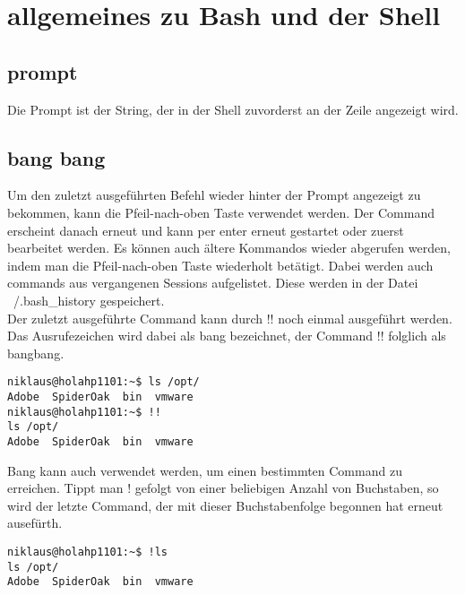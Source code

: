\section{allgemeines zu Bash und der Shell}
\subsection{prompt}
Die Prompt ist der String, der in der Shell zuvorderst an der Zeile angezeigt wird.
\subsection{bang bang}
Um den zuletzt ausgef\"uhrten Befehl wieder hinter der Prompt angezeigt zu bekommen, kann die Pfeil-nach-oben Taste verwendet werden. Der Command erscheint danach erneut und kann per enter erneut gestartet oder zuerst bearbeitet werden. Es k\"onnen auch \"altere Kommandos wieder abgerufen werden, indem man die Pfeil-nach-oben Taste wiederholt bet\"atigt. Dabei werden auch commands aus vergangenen Sessions aufgelistet. Diese werden in der Datei ~/.bash\_history gespeichert.\\
Der zuletzt ausgef\"uhrte Command kann durch !! noch einmal ausgef\"uhrt werden. Das Ausrufezeichen wird dabei als bang bezeichnet, der Command !! folglich als bangbang.
\begin{lstlisting}[frame=single]
niklaus@holahp1101:~$ ls /opt/
Adobe  SpiderOak  bin  vmware
niklaus@holahp1101:~$ !!
ls /opt/
Adobe  SpiderOak  bin  vmware
\end{lstlisting}
Bang kann auch verwendet werden, um einen bestimmten Command zu erreichen. Tippt man ! gefolgt von einer beliebigen Anzahl von Buchstaben, so wird der letzte Command, der mit dieser Buchstabenfolge begonnen hat erneut ausef\"urth.
\begin{lstlisting}[frame=single]
niklaus@holahp1101:~$ !ls
ls /opt/
Adobe  SpiderOak  bin  vmware
\end{lstlisting}
